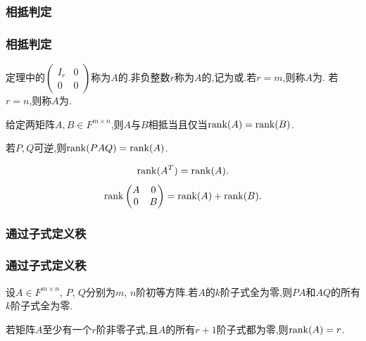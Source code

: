 \subsubsection{相抵判定}
\begin{frame}\frametitle{相抵判定}

\begin{definition}
定理中的$\begin{pmatrix}I_r&0\\0&0\end{pmatrix}$称为$A$的.\pp 非负整数$r$称为$A$的,\pp 记为或.\pp 若$r=m$,则称$A$为.\pp
若$r=n$,则称$A$为.
\end{definition}

\begin{corollary}[相抵判定]
给定两矩阵$A,B\in F^{m\times n}$,则$A$与$B$相抵当且仅当$\operatorname{rank}(A)=\operatorname{rank}(B)$.
\end{corollary}
\pp
\begin{corollary}若$P,Q$可逆,则$\operatorname{rank}(PAQ)=\operatorname{rank}(A)$.
\end{corollary}
\pp
\begin{example}
\[\operatorname{rank}(A^T)=\operatorname{rank}(A).\]
\pp
\[\operatorname{rank}\begin{pmatrix}A&0\\0&B\end{pmatrix}=\operatorname{rank}(A)+\operatorname{rank}(B).\]
\end{example}
\end{frame}

\renewcommand{\mydate}{2025年04月03号\ 第十二次课}



\subsubsection{通过子式定义秩}
\begin{frame}\frametitle{通过子式定义秩}
\begin{proposition}
设$A\in F^{m\times n}$, $P$, $Q$分别为$m$, $n$阶初等方阵.若$A$的$k$阶子式全为零,则$PA$和$AQ$的所有$k$阶子式全为零.
\end{proposition}
\pp

\begin{proposition}[通过子式定义秩]
若矩阵$A$至少有一个$r$阶非零子式,且$A$的所有$r+1$阶子式都为零,则$\operatorname{rank}(A)=r$.
\end{proposition}
\end{frame}




